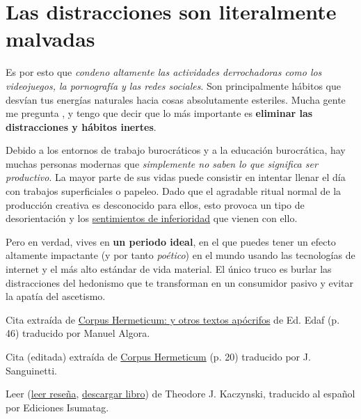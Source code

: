 \documentclass{article}
\begin{document}
	\section*{Las distracciones son literalmente malvadas}

	Es por esto que \textit{condeno altamente las actividades derrochadoras como
	los videojuegos, la pornografía y las redes sociales}. Son
	principalmente hábitos que desvían tus energías naturales hacia cosas
	absolutamente esteriles. Mucha gente me pregunta , y tengo que decir que lo más importante
	es \textbf{eliminar las distracciones y hábitos inertes}.

	Debido a los entornos de trabajo burocráticos y a la educación
	burocrática, hay muchas personas modernas que \textit{simplemente no
	saben lo que significa ser productivo}. La mayor parte de sus vidas
	puede consistir en intentar llenar el día con trabajos superficiales
	o papeleo. Dado que el agradable ritual normal de la producción creativa
	es desconocido para ellos, esto provoca un tipo de desorientación y los
	\href{https://lukesmith.xyz/files/unabomber.pdf}{sentimientos de
	inferioridad} \cite{tres} que vienen con ello.

	Pero en verdad, vives en \textbf{un periodo ideal}, en el que puedes
	tener un efecto altamente impactante (y por tanto \textit{poético}) en
	el mundo usando las tecnologías de internet y el más alto estándar de
	vida material. El único truco es burlar las distracciones del hedonismo
	que te transforman en un consumidor pasivo y evitar la apatía del
	ascetismo.

	\renewcommand\refname{\large{Notas del traductor}}

	\begin{thebibliography}{9}
		 Cita extraída de
		\href{https://books.google.com.co/books/about/Corpus_Hermeticum.html?hl=es&id=It8Jo57qFVgC}
		{Corpus Hermeticum: y otros textos apócrifos} de Ed. Edaf
		(p. 46) traducido por Manuel Algora.
		
		 Cita (editada) extraída de
		\href{http://www.ricardoego.com/libros/Corpus%20Hermeticum%20-%20Trismegisto%20Hermes.pdf}
		{Corpus Hermeticum} (p. 20) traducido por J. Sanguinetti. 

		 Leer 
		(\href{https://isumatag.blogspot.com/p/la-sociedad-industrial-y-su-futuro.html}
		{leer reseña},
		\href{http://libgen.rs/book/index.php?md5=F50ABA1457C931AA22DD7BC84D5A90C9}
		{descargar libro}) de Theodore J. Kaczynski, traducido al español por
		Ediciones Isumatag.
	\end{thebibliography}
\end{document}
